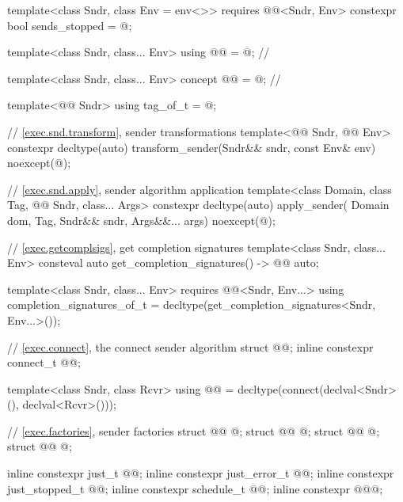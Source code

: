 \begin{codeblock}
{  template<class Sndr, class Env = env<>>
      requires @@<Sndr, Env>
    constexpr bool sends_stopped = @\seebelow@;

  template<class Sndr, class... Env>
    using @@ = @\seebelownc@;                 // \expos

  template<class Sndr, class... Env>
    concept @@ = @\seebelow@;                         // \expos

  template<@@ Sndr>
    using tag_of_t = @\seebelow@;

  // \ref{exec.snd.transform}, sender transformations
  template<@@ Sndr, @@ Env>
    constexpr decltype(auto) transform_sender(Sndr&& sndr,
      const Env& env) noexcept(@\seebelow@);

  // \ref{exec.snd.apply}, sender algorithm application
  template<class Domain, class Tag, @@ Sndr, class... Args>
    constexpr decltype(auto) apply_sender(
      Domain dom, Tag, Sndr&& sndr, Args&&... args) noexcept(@\seebelow@);

  // \ref{exec.getcomplsigs}, get completion signatures
  template<class Sndr, class... Env>
    consteval auto get_completion_signatures() -> @@ auto;

  template<class Sndr, class... Env>
      requires @@<Sndr, Env...>
    using completion_signatures_of_t = decltype(get_completion_signatures<Sndr, Env...>());

  // \ref{exec.connect}, the connect sender algorithm
  struct @@;
  inline constexpr connect_t @@{};

  template<class Sndr, class Rcvr>
    using @@ =
      decltype(connect(declval<Sndr>(), declval<Rcvr>()));

  // \ref{exec.factories}, sender factories
  struct @@ { @\unspec@ };
  struct @@ { @\unspec@ };
  struct @@ { @\unspec@ };
  struct @@ { @\unspec@ };

  inline constexpr just_t @@{};
  inline constexpr just_error_t @@{};
  inline constexpr just_stopped_t @@{};
  inline constexpr schedule_t @@{};
  inline constexpr @\unspec@ @@{};

}
\end{codeblock}
